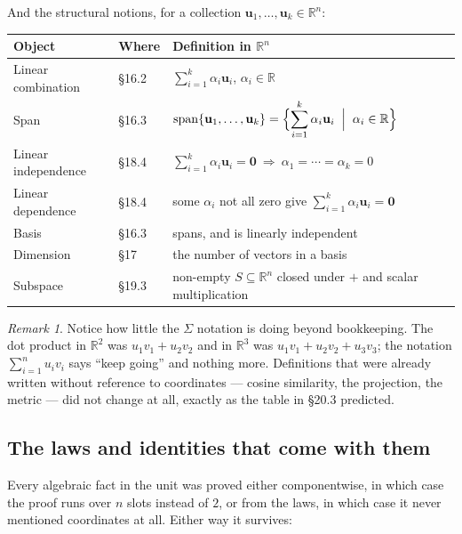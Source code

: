\documentclass[11pt]{article}
\theoremstyle{definition}
\theoremstyle{remark}
\newtheorem*{rmk}{Remark}
\newcommand{\R}{\mathbb{R}}
\newcommand{\vc}[1]{\mathbf{#1}}
\DeclareMathOperator{\spanop}{span}
\begin{document}
\noindent And the structural notions, for a collection
$\vc{u}_1,\dots,\vc{u}_k\in\R^{n}$:

\begin{center}
\renewcommand{\arraystretch}{2.0}
\begin{tabular}{@{}l l l@{}}
\toprule
\textbf{Object} & \textbf{Where} & \textbf{Definition in $\R^{n}$} \\
\midrule
Linear combination & \S16.2
  & $\displaystyle\sum_{i=1}^{k}\alpha_i\vc{u}_i$, \quad $\alpha_i\in\R$ \\
Span & \S16.3
  & $\displaystyle\spanop\{\vc{u}_1,\dots,\vc{u}_k\}
     = \Bigl\{\sum_{i=1}^{k}\alpha_i\vc{u}_i \;\Bigm|\; \alpha_i\in\R\Bigr\}$ \\
Linear independence & \S18.4
  & $\displaystyle\sum_{i=1}^{k}\alpha_i\vc{u}_i=\vc{0}
     \ \Longrightarrow\ \alpha_1=\cdots=\alpha_k=0$ \\
Linear dependence & \S18.4
  & some $\alpha_i$ not all zero give $\displaystyle\sum_{i=1}^{k}\alpha_i\vc{u}_i=\vc{0}$ \\
Basis & \S16.3
  & spans, and is linearly independent \\
Dimension & \S17
  & the number of vectors in a basis \\
Subspace & \S19.3
  & non-empty $S\subseteq\R^{n}$ closed under $+$ and scalar multiplication \\
\bottomrule
\end{tabular}
\end{center}

\begin{rmk}
Notice how little the $\Sigma$ notation is doing beyond bookkeeping. The dot
product in $\R^{2}$ was $u_1v_1+u_2v_2$ and in $\R^{3}$ was
$u_1v_1+u_2v_2+u_3v_3$; the notation $\sum_{i=1}^{n}u_iv_i$ says ``keep going''
and nothing more. Definitions that were already written without reference to
coordinates --- cosine similarity, the projection, the metric --- did not change
at all, exactly as the table in \S20.3 predicted.
\end{rmk}

\subsection{The laws and identities that come with them}
Every algebraic fact in the unit was proved either componentwise, in which case
the proof runs over $n$ slots instead of $2$, or from the laws, in which case it
never mentioned coordinates at all. Either way it survives:
\end{document}
